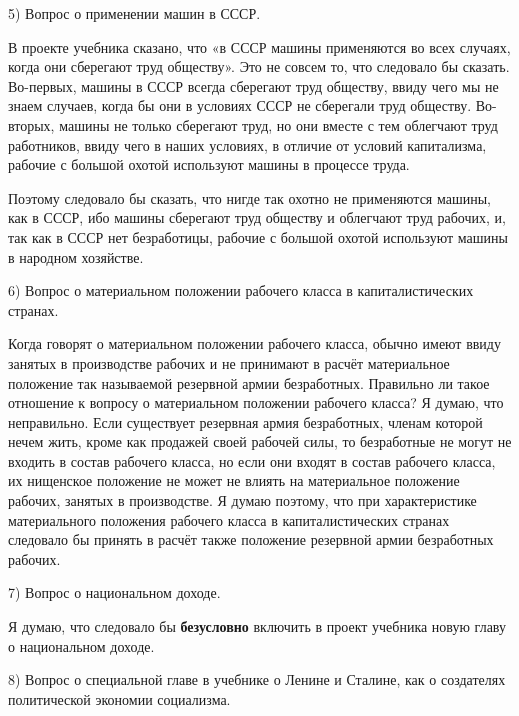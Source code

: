 \documentclass[12pt, a4paper, openany]{book}
\begin{document}
5) Вопрос о применении машин в СССР.



В проекте учебника сказано, что «в СССР машины применяются во всех случаях, когда они сберегают труд обществу». Это не совсем то, что следовало бы сказать. Во-первых, машины в СССР всегда сберегают труд обществу, ввиду чего мы не знаем случаев, когда бы они в условиях СССР не сберегали труд обществу. Во-вторых, машины не только сберегают труд, но они вместе с тем облегчают труд работников, ввиду чего в наших условиях, в отличие от условий капитализма, рабочие с большой охотой используют машины в процессе труда.



Поэтому следовало бы сказать, что нигде так охотно не применяются машины, как в СССР, ибо машины сберегают труд обществу и облегчают труд рабочих, и, так как в СССР нет безработицы, рабочие с большой охотой используют машины в народном хозяйстве.



6) Вопрос о материальном положении рабочего класса в капиталистических странах.



Когда говорят о материальном положении рабочего класса, обычно имеют ввиду занятых в производстве рабочих и не принимают в расчёт материальное положение так называемой резервной армии безработных. Правильно ли такое отношение к вопросу о материальном положении рабочего класса? Я думаю, что неправильно. Если существует резервная армия безработных, членам которой нечем жить, кроме как продажей своей рабочей силы, то безработные не могут не входить в состав рабочего класса, но если они входят в состав рабочего класса, их нищенское положение не может не влиять на материальное положение рабочих, занятых в производстве. Я думаю поэтому, что при характеристике материального положения рабочего класса в капиталистических странах следовало бы принять в расчёт также положение резервной армии безработных рабочих.



7) Вопрос о национальном доходе.



Я думаю, что следовало бы \textbf{безусловно} включить в проект учебника новую главу о национальном доходе.



8) Вопрос о специальной главе в учебнике о Ленине и Сталине, как о создателях политической экономии социализма.
\end{document}
